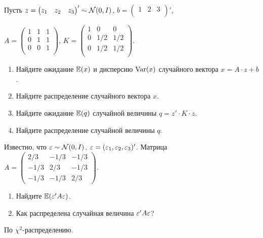 \begin{problem}
Пусть $z =  \begin{pmatrix}
z_1 & z_2 & z_3\\
\end{pmatrix} ' \sim \mathcal{N}(0, I)$, $b =  \begin{pmatrix}
1 & 2 & 3\\
\end{pmatrix} '$,

$A =  \begin{pmatrix}
1 & 1 & 1 \\
0 & 1 & 1 \\
0 & 0 & 1 \\
\end{pmatrix} $, $K =  \begin{pmatrix}
1 & 0 & 0 \\
0 & 1/2 & 1/2 \\
0 & 1/2 & 1/2 \\
\end{pmatrix} $.

\begin{enumerate}
\item Найдите ожидание $\mathbb{E}(x)$ и дисперсию $\operatorname{Var} (x)$ случайного вектора $x = A \cdot z + b$.
\item Найдите распределение случайного вектора $x$.
\item Найдите ожидание $\mathbb{E}(q)$ случайной величины $q = z' \cdot K \cdot z$.
\item Найдите распределение случайной величины $q$.
\end{enumerate}


\begin{sol}
\end{sol}
\end{problem}



\begin{problem}
Известно, что $\varepsilon\sim \mathcal{N}(0,I)$, $\varepsilon=(\varepsilon_1,\varepsilon_2,\varepsilon_3)'$. Матрица $A=\left(\begin{matrix}
2/3 & -1/3 & -1/3 \\
-1/3 & 2/3 & -1/3 \\
-1/3 & -1/3 & 2/3
\end{matrix}\right)$.
\begin{enumerate}
\item Найдите $\mathbb{E}(\varepsilon'A\varepsilon)$.
\item Как распределена случайная величина $\varepsilon' A\varepsilon$?
\end{enumerate}


\begin{sol}
По $\chi^2$-распределению.
\end{sol}
\end{problem}



